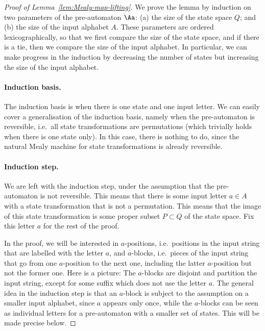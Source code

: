 \begin{proof}[Proof of Lemma~\ref{lem:Mealy-map-lifting}]
We prove the lemma by induction on two parameters of the pre-automaton $\Aa$: (a) the size of the state space $Q$; and (b) the size of the input alphabet $A$. These parameters are ordered lexicographically, so that we first compare the size of the state space, and if there is a tie, then we compare the size of the input alphabet. In particular, we can make progress in the induction by decreasing the number of states but increasing the size of the input alphabet. 

\paragraph*{Induction basis.} The induction basis is when there is one state and one input letter. We can easily cover a generalisation of the induction basis, namely when the pre-automaton is reversible, i.e.~all  state transformations are permutations (which trivially holds when there is one state only). In this case, there is nothing to do, since the natural Mealy machine for state transformations is already reversible. 

\paragraph*{Induction step.} We are left with the induction step, under the assumption that the pre-automaton is not reversible. This means that there is some input letter $a \in A$ with a state  transformation that is  not a permutation. This means that the image of this state transformation is some proper subset $P \subset Q$ of the state space.   Fix this letter $a$ for the rest of the proof. 

In the proof, we will be interested in $a$-positions, i.e.~positions in the input string that are labelled with the letter $a$, and $a$-blocks, i.e.~pieces of the input string that go from one $a$-position to the next one, including the latter $a$-position but not the former one. Here is a picture:
The $a$-blocks are disjoint and partition the input string, except for some suffix which does not use the letter $a$. 
The general idea in the induction step is  that an $a$-block is subject to the assumption on a smaller input alphabet, since $a$ appears only once, while the $a$-blocks can be seen as individual letters for a pre-automaton with a smaller set of states. This will be made precise below.




\end{proof}
